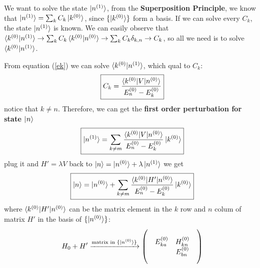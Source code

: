 \documentclass[UTF8,12pt]{article} %
\begin{document}
We want to solve the state $\ket{n^{(1)}}$, from the \textbf{Superposition Principle}, we know that $\ket{n^{(1)}}=\sum_k{C_k \ket{k^{(0)}}}$, since $\{\ket{k^{(0)}}\}$ form a basis. If we can solve every $C_k$, the state $\ket{n^{(1)}}$ is known. We can easily observe that $\braket{k^{(0)} | n^{(1)}} \to \sum_k{ C_k \braket{ k^{(0)} | n^{(0)} } } \to \sum_k{ C_k \delta_{k,n} } \to C_k$, so all we need is to solve $\braket{ k^{(0)} | n^{(1)} }$. 

From equation (\ref{ek}) we can solve $\braket{ k^{(0)} | n^{(1)} }$, which qual to $C_k$:
\begin{equation}
    \boxed{ C_k = \frac{\braket{k^{(0)}|V|n^{(0)}}}{E^{(0)}_n-E^{(0)}_k}}
\end{equation}
notice that $k\neq n$. Therefore, we can get the {\bf first order perturbation for state $\ket{n}$ }
\begin{equation}
    \boxed{ \ket{n^{(1)}} = \sum_{k\neq m} \frac{ \braket{ k^{(0)}|V | n^{(0)} } }{ E^{(0)}_n - E^{(0)}_k } \ket{ k^{(0)}}}
\end{equation}
plug it and $H'=\lambda V$ back to $ \ket{n} = \ket{n^{(0)}} + \lambda \ket{n^{(1)}} $ we get 
\begin{equation}
    \boxed{ \ket{n} = \ket{n^{(0)}} + \sum_{k\neq m} \frac{ \braket{ k^{(0)}|H'| n^{(0)} } }{ E^{(0)}_n - E^{(0)}_k } \ket{ k^{(0)}}}
\end{equation}
where $\braket{k^{(0)}|H'|n^{(0)}}$ can be the matrix element in the $k$ row and $n$ colum of matrix $H'$ in the basis of $\{\ket{n^{(0)}}\}$:
\begin{align}
H_{0} + H' \xrightarrow{\text{matrix in } \{\ket{n^{(0)}}\}}
\begin{pmatrix}
    &  &  &  \\
    & E^{(0)}_{ka} & H^{(0)}_{kn} & \\
    &  & E^{(0)}_{bn} & \\
    &  & & \\
\end{pmatrix}
\end{align}
\end{document}
